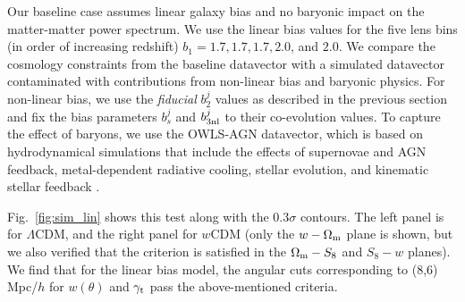 \documentclass[aps, prd,twocolumn,superscriptaddress,nofootinbib,preprintnumbers]{revtex4-1}
\begin{document}
Our baseline case assumes linear galaxy bias and no baryonic impact on the matter-matter power spectrum. We use the linear bias values for the five lens bins (in order of increasing redshift) $b_1 = 1.7, 1.7, 1.7, 2.0$, and  $2.0$. We compare the cosmology constraints from the baseline datavector with a simulated datavector contaminated with contributions from non-linear bias and baryonic physics. For non-linear bias, we use the \textit{fiducial} $b^j_2$ values as described in the previous section and fix the bias parameters $b^j_s$ and $b^j_{\rm 3nl}$ to their co-evolution values. To capture the effect of baryons, we use the OWLS-AGN datavector, which is based on hydrodynamical simulations that include the effects of supernovae and AGN feedback, metal-dependent radiative cooling, stellar evolution, and kinematic stellar feedback \citep{Le_Brun_2014}. 

Fig.~\ref{fig:sim_lin} shows this test along with the 0.3$\sigma$ contours. The left panel is for $\Lambda$CDM, and the right panel for $w$CDM (only the $w- \Omega_{\rm m}$ plane is shown, but we also verified that the criterion is satisfied in the $\Omega_{\rm m}-S_8$ and $S_8-w$  planes). We find that for the linear bias model, the angular cuts corresponding to (8,6) Mpc/$h$ for $w(\theta)$ and $\gamma_{\rm t}$ pass the above-mentioned criteria. 
\end{document}
